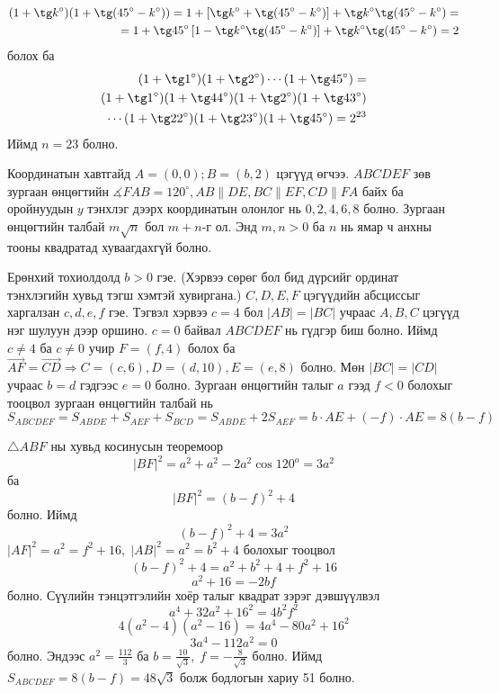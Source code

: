 \documentclass[10pt,a4paper,oneside]{book}
\begin{document}
\ASolution
\begin{align*}
(1+\tg k^\circ)(1+\tg (45^\circ-k^\circ)) = 1+\left[\tg k^\circ + \tg (45^\circ - k^\circ)\right] + \tg k^\circ \tg (45^\circ - k^\circ) = \\
= 1+\tg 45^\circ\left[1- \tg k^\circ \tg(45^\circ - k^\circ)\right] + \tg k^\circ \tg (45^\circ - k^\circ) = 2
\end{align*}
болох ба
\begin{align*}
(1+\tg 1^\circ)(1+\tg 2^\circ)\cdots(1+\tg 45^\circ) =\\
(1+\tg 1^\circ)(1+\tg 44^\circ)(1+\tg 2^\circ)(1+\tg 43^\circ)\\
\cdots(1+\tg 22^\circ)(1+\tg 23^\circ)(1+\tg 45^\circ) = 2^{23}
\end{align*}
Иймд $n=23$ болно.

\Problem
[AIME 2003] Координатын хавтгайд $A=(0, 0); B=(b, 2)$ цэгүүд өгчээ. $ABCDEF$ зөв зургаан өнцөгтийн $\measuredangle FAB = 120^\circ, AB \| DE, BC\|EF, CD\|FA$ байх ба оройнуудын $y$ тэнхлэг дээрх координатын олонлог нь ${0, 2, 4, 6, 8}$ болно. Зургаан өнцөгтийн талбай $m\sqrt{n}$ бол $m+n$-г ол. Энд $m, n > 0$ ба $n$ нь ямар ч анхны тооны квадратад хуваагдахгүй болно.

\Note
Ерөнхий тохиолдолд $b>0$ гэе. (Хэрвээ сөрөг бол бид дүрсийг ординат тэнхлэгийн хувьд тэгш хэмтэй хувиргана.) $C, D, E, F$ цэгүүдийн абсциссыг харгалзан $c, d, e, f$ гэе. Тэгвэл хэрвээ $c=4$ бол $|AB| = |BC|$ учраас $A, B ,C$ цэгүүд нэг шулуун дээр оршино. $c=0$ байвал $ABCDEF$ нь гүдгэр биш болно. Иймд $c \neq 4$ ба $c \neq 0$ учир $F=(f, 4)$ болох ба $\overrightarrow{AF} = \overrightarrow{CD} \Rightarrow C=(c, 6), D = (d, 10), E=(e, 8)$ болно. Мөн $|BC| = |CD|$ учраас $b=d$ гэдгээс $e=0$ болно. Зургаан өнцөгтийн талыг $a$ гээд $f<0$ болохыг тооцвол зургаан өнцөгтийн талбай нь
\begin{equation*}
S_{ABCDEF} = S_{ABDE} + S_{AEF} + S_{BCD} = S_{ABDE} + 2S_{AEF} = b\cdot AE + (-f)\cdot AE = 8(b-f)
\end{equation*}

\ASolution
 $\triangle ABF$ ны хувьд косинусын теоремоор
\begin{equation*}
|BF|^2 = a^2 + a^2 - 2a^2\cos 120^o = 3a^2
\end{equation*}
ба 
\begin{equation*}
|BF|^2 = (b-f)^2+4
\end{equation*}
болно. Иймд
\begin{equation*}
(b-f)^2 + 4 = 3a^2
\end{equation*}
$|AF|^2 = a^2 = f^2 + 16, \; |AB|^2 = a^2 = b^2 + 4$ болохыг тооцвол
\begin{equation*}
(b-f)^2 + 4 = a^2 + b^2 + 4 + f^2 + 16
\end{equation*}
\begin{equation*}
a^2 + 16 = -2bf
\end{equation*}
болно. Сүүлийн тэнцэтгэлийн хоёр талыг квадрат зэрэг дэвшүүлвэл
$$a^4 + 32a^2 + 16^2 = 4b^2f^2$$
$$4(a^2-4)(a^2-16) = 4a^4 - 80a^2 + 16^2$$
$$3a^4 - 112a^2 = 0$$
болно. Эндээс $a^2 = \frac{112}{3}$ ба $b = \frac{10}{\sqrt{3}}, \; f = -\frac{8}{\sqrt{3}}$ болно. Иймд $S_{ABCDEF} = 8(b-f) = 48\sqrt{3}$ болж бодлогын хариу 51 болно.
\end{document}
